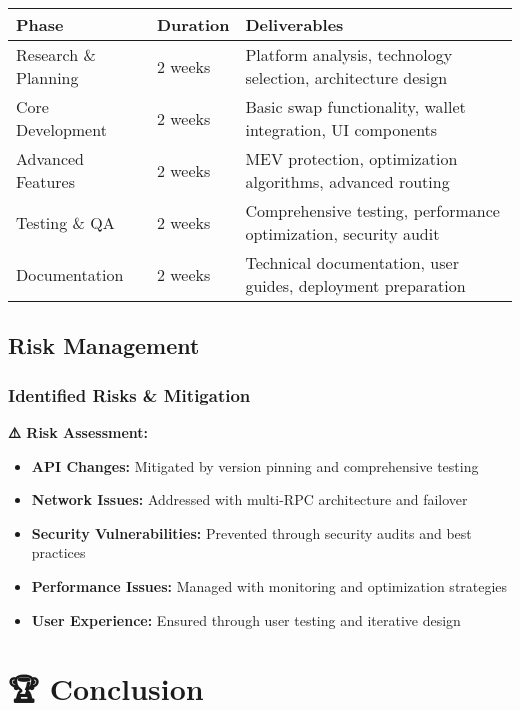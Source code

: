 \documentclass[12pt,a4paper]{article}
\begin{document}
\begin{longtable}{|p{3cm}|p{2cm}|p{8cm}|}
\hline
\textbf{Phase} & \textbf{Duration} & \textbf{Deliverables} \\
\hline
\endhead

Research \& Planning & 2 weeks & Platform analysis, technology selection, architecture design \\
\hline
Core Development & 2 weeks & Basic swap functionality, wallet integration, UI components \\
\hline
Advanced Features & 2 weeks & MEV protection, optimization algorithms, advanced routing \\
\hline
Testing \& QA & 2 weeks & Comprehensive testing, performance optimization, security audit \\
\hline
Documentation & 2 weeks & Technical documentation, user guides, deployment preparation \\
\hline
\end{longtable}

\subsection{Risk Management}

\subsubsection{Identified Risks \& Mitigation}

\begin{tcolorbox}[colback=warningOrange!10,colframe=warningOrange]
\textbf{⚠️ Risk Assessment:}
\begin{itemize}
    \item \textbf{API Changes:} Mitigated by version pinning and comprehensive testing
    \item \textbf{Network Issues:} Addressed with multi-RPC architecture and failover
    \item \textbf{Security Vulnerabilities:} Prevented through security audits and best practices
    \item \textbf{Performance Issues:} Managed with monitoring and optimization strategies
    \item \textbf{User Experience:} Ensured through user testing and iterative design
\end{itemize}
\end{tcolorbox}

\section{🏆 Conclusion}
\end{document}
